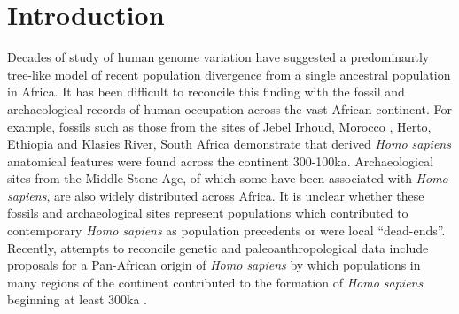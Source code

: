 \documentclass[]{article}
\begin{document}
\section*{Introduction}


Decades of study of human genome variation have suggested a predominantly
tree-like model of recent population divergence from a single ancestral
population in Africa. It has been difficult to reconcile this finding with the
fossil and archaeological records of human occupation across the vast African
continent. For example, fossils such as those from the sites of Jebel Irhoud,
Morocco \citep{Hublin2017-cq}, Herto, Ethiopia \citep{White2003-bk} and Klasies
River, South Africa \citep{Deacon1995-rx} demonstrate that derived \emph{Homo
sapiens} anatomical features were found across the continent
300-100ka. Archaeological sites from the Middle Stone Age, of which some have
been associated with \emph{Homo sapiens}, are also widely distributed across
Africa. It is unclear whether these fossils and archaeological sites represent
populations which contributed to contemporary \emph{Homo sapiens} as population
precedents or were local ``dead-ends''. Recently, attempts to reconcile genetic
and paleoanthropological data include proposals for a Pan-African origin of
\emph{Homo sapiens} by which populations in many regions of the continent
contributed to the formation of \emph{Homo sapiens} beginning at least 300ka
\citep{Stringer2016-mj,Scerri2018-nl,Scerri2019-xg}.
\end{document}

